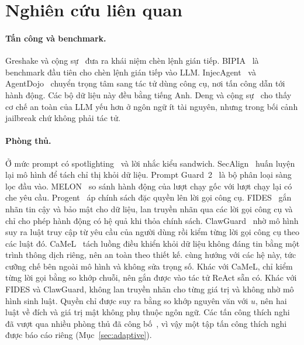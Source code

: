 \section{Nghiên cứu liên quan}\label{sec:related}

\paragraph{Tấn công và benchmark.} Greshake và cộng sự~\cite{greshake2023indirect} đưa ra khái niệm chèn lệnh gián
tiếp. BIPIA~\cite{yi2025bipia} là benchmark đầu tiên cho chèn lệnh gián tiếp vào LLM. InjecAgent~\cite{zhan2024injecagent}
và AgentDojo~\cite{debenedetti2024agentdojo} chuyển trọng tâm sang tác tử dùng công cụ, nơi tấn công dẫn tới hành động.
Các bộ dữ liệu này đều bằng tiếng Anh. Deng và cộng sự~\cite{deng2024multijail} cho thấy cơ chế an toàn của LLM yếu
hơn ở ngôn ngữ ít tài nguyên, nhưng trong bối cảnh jailbreak chứ không phải tác tử.

\paragraph{Phòng thủ.} Ở mức prompt có spotlighting~\cite{hines2024spotlighting} và lời nhắc kiểu sandwich.
SecAlign~\cite{chen2025secalign} huấn luyện lại mô hình để tách chỉ thị khỏi dữ liệu. Prompt
Guard~2~\cite{meta2025promptguard2} là bộ phân loại sàng lọc đầu vào. MELON~\cite{zhu2025melon} so sánh hành động của
lượt chạy gốc với lượt chạy lại có che yêu cầu. Progent~\cite{shi2025progent} áp chính sách đặc quyền lên lời gọi công
cụ. FIDES~\cite{costa2025fides} gắn nhãn tin cậy và bảo mật cho dữ liệu, lan truyền nhãn qua các lời gọi công cụ và
chỉ cho phép hành động có hệ quả khi thỏa chính sách. ClawGuard~\cite{zhao2026clawguard} nhờ mô hình suy ra luật truy
cập từ yêu cầu của người dùng rồi kiểm từng lời gọi công cụ theo các luật đó. CaMeL~\cite{debenedetti2026camel} tách luồng điều khiển khỏi dữ liệu không đáng tin bằng một trình thông dịch riêng,
nên an toàn theo thiết kế. \ours{} cùng hướng với các hệ này, tức cưỡng chế bên ngoài mô hình và không sửa trọng số. Khác với CaMeL, \ours{} chỉ kiểm
từng lời gọi bằng so khớp chuỗi, nên gắn được vào tác tử ReAct sẵn có. Khác với FIDES và ClawGuard, \ours{} không lan truyền nhãn
cho từng giá trị và không nhờ mô hình sinh luật. Quyền chỉ được suy ra bằng so khớp nguyên văn với $u$, nên hai luật về
đích và giá trị mật không phụ thuộc ngôn ngữ. Các tấn công thích nghi đã vượt qua nhiều phòng thủ đã
công bố~\cite{zhan2025adaptive,nasr2025attacker}, vì vậy một tập tấn công thích nghi được báo cáo riêng
(Mục~\ref{sec:adaptive}).
